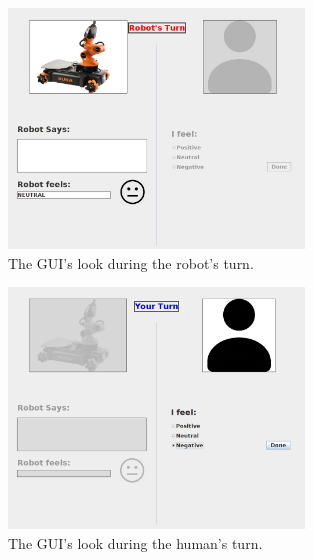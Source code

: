 \documentclass[12pt]{report}
\begin{document}
\begin{figure}[tbh]
  \centering
  \includegraphics[width=0.7\textwidth]{figure/robot-turn-gui.png}
  \caption{The GUI's look during the robot's turn.}
  \label{fig:robot-turn-gui}
  \vspace*{-3mm}
\end{figure}

\begin{figure}[tbh]
  \centering
  \includegraphics[width=0.7\textwidth]{figure/human-turn-gui.png}
  \caption{The GUI's look during the human's turn.}
  \label{fig:human-turn-gui}
  \vspace*{-3mm}
\end{figure}
\end{document}

